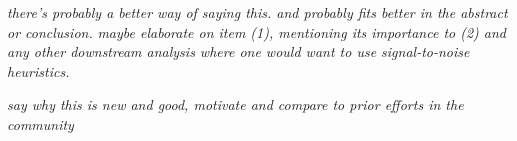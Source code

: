 \documentclass[12pt]{iopart}
\begin{document}
\emph{there's probably a better way of saying this. and probably fits better in the abstract or conclusion.}
\emph{maybe elaborate on item (1), mentioning its importance to (2) and any other downstream analysis where one would want to use signal-to-noise heuristics.}



\emph{say why this is new and good, motivate and compare to prior efforts in the community}

%
%
%
%
%

\end{document}
